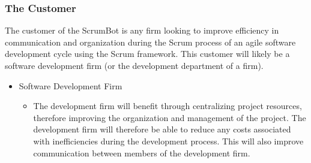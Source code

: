 \documentclass[12pt, titlepage]{article}
\begin{document}
\subsubsection{The Customer}
The customer of the ScrumBot is any firm looking to improve efficiency in communication and organization during the Scrum process of an agile software development cycle using the Scrum framework. This customer will likely be a software development firm (or the development department of a firm).
\begin{itemize}
    \item Software Development Firm
    \begin{itemize}
      \item[] The development firm will benefit through centralizing project resources, therefore improving the organization and management of the project. The development firm will therefore be able to reduce any costs associated with inefficiencies during the development process. This will also improve communication between members of the development firm.
    \end{itemize}
\end{itemize}
\end{document}
